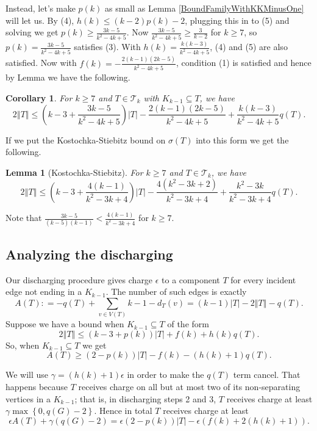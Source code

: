 \documentclass[12pt]{article}
\theoremstyle{plain}
\newtheorem{lem}[thm]{Lemma}
\newtheorem{cor}[thm]{Corollary}
\theoremstyle{definition}
\theoremstyle{remark}
\newcommand{\fancy}[1]{\mathcal{#1}}
\newcommand{\T}{\fancy{T}}
\newcommand{\set}[1]{\left\{ #1 \right\}}
\newcommand{\card}[1]{\left|#1\right|}
\newcommand{\size}[1]{\left\Vert#1\right\Vert}
\newcommand{\parens}[1]{\left( #1 \right)}
\newcommand{\DefinedAs}{\mathrel{\mathop:}=}
\begin{document}
Instead, let's make $p(k)$ as small as Lemma \ref{BoundFamilyWithKKMinusOne} will let us. By (4), $h(k) \le (k-2)p(k) - 2$, plugging this in to (5) and solving we get $p(k) \ge \frac{3k-5}{k^2 - 4k + 5}$.  Now $\frac{3k-5}{k^2 - 4k + 5} \ge \frac{3}{k-2}$ for $k \ge 7$, so $p(k) = \frac{3k-5}{k^2 - 4k + 5}$ satisfies (3).  With $h(k) = \frac{k(k-3)}{k^2 - 4k + 5}$, (4) and (5) are also satisfied. Now with $f(k) = -\frac{2(k-1)(2k-5)}{k^2 - 4k + 5}$, condition (1) is satisfied and hence by Lemma we have the following.

\begin{cor}\label{SmallP}
	For $k \ge 7$ and $T \in \T_k$ with $K_{k-1} \subseteq T$, we have
	\[2\size{T} \le \parens{k-3 + \frac{3k-5}{k^2 - 4k + 5}}\card{T} - \frac{2(k-1)(2k-5)}{k^2 - 4k + 5} + \frac{k(k-3)}{k^2 - 4k + 5}q(T).\]
\end{cor}

If we put the Kostochka-Stiebitz bound on $\sigma(T)$ into this form we get the following.

\begin{lem}[Kostochka-Stiebitz]
		For $k \ge 7$ and $T \in \T_k$, we have
		\[2\size{T} \le \parens{k-3 + \frac{4(k-1)}{k^2 - 3k + 4}}\card{T} - \frac{4(k^2-3k+2)}{k^2-3k+4} + \frac{k^2 - 3k}{k^2-3k+4}q(T).\]
\end{lem}

Note that $\frac{3k-5}{(k-5)(k-1)} < \frac{4(k-1)}{k^2 - 3k + 4}$ for $k \ge 7$.

\subsection{Analyzing the discharging}
Our discharging procedure gives charge $\epsilon$ to a component $T$ for every incident edge not ending in a $K_{k-1}$.  The number of such edges is exactly
\[A(T) \DefinedAs -q(T) + \sum_{v \in V(T)} k-1 - d_T(v) = (k-1)\card{T} - 2\size{T} - q(T).\]
Suppose we have a bound when $K_{k-1} \subseteq T$ of the form
\[2\size{T} \le (k-3 + p(k))\card{T} + f(k) + h(k)q(T).\]
So, when $K_{k-1} \subseteq T$ we get
\[A(T) \ge (2-p(k))\card{T} - f(k) - (h(k) + 1)q(T).\]

We will use $\gamma = (h(k) + 1)\epsilon$ in order to make the $q(T)$ term cancel.  That happens because $T$ receives charge on all but at most two of its non-separating vertices in a $K_{k-1}$; that is, in discharging steps 2 and 3, $T$ receives charge at least $\gamma\max\set{0, q(G) - 2}$.   Hence in total $T$ receives charge at least
\[\epsilon A(T) + \gamma(q(G) - 2) = \epsilon\parens{2-p(k)}\card{T} - \epsilon \parens{f(k) + 2(h(k) + 1)}.\]
\end{document}
